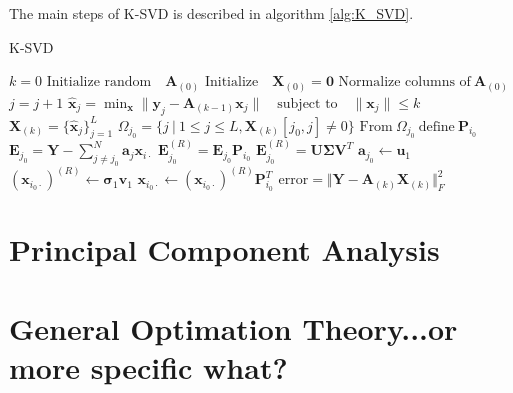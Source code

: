 The main steps of K-SVD is described in algorithm \ref{alg:K_SVD}. 
\begin{algorithm}[H]
\caption{K-SVD}
\begin{algorithmic}[1]
			\State$k = 0$			
			\State$\text{Initialize random} \quad  \textbf{A}_{(0)}$            
			\State$\text{Initialize} \quad \textbf{X}_{(0)}=\mathbf{0}$
			\State
            \State$\text{Normalize columns of} \ \textbf{A}_{(0)}$
                \State $j = j+1$
                 
                	\State$\hat{\textbf{x}}_{j} = \min_{\textbf{x}} \|\textbf{y}_j -\textbf{A}_{(k-1)}\textbf{x}_{j}\| \quad \text{subject to} \quad \|\textbf{x}_{j}\| \leq k $ 
				\EndFor
				\State$\textbf{X}_{(k)} = \lbrace \hat{\textbf{x}}_{j} \rbrace_{j=1}^{L}$
					\State$\Omega_{j_0} = \lbrace j \ \vert \ 1 \leq j \leq L, \textbf{X}_{(k)} [j_0, j]\neq 0\rbrace$
					\State$\text{From} \ \Omega_{j_0} \ \text{define} \ \textbf{P}_{i_0} $
					\State$\textbf{E}_{j_0} =  \textbf{Y} - \sum_{j \neq j_{0}}^{N} \textbf{a}_j \textbf{x}_{i \cdot}$
					\State$\textbf{E}_{j_0}^{(R)} =  \textbf{E}_{j_0} \textbf{P}_{i_0}$
					\State$\textbf{E}_{j_0}^{(R)} =\textbf{U} \boldsymbol{\Sigma} \textbf{V}^T$ 
					\State$\textbf{a}_{j_0} \gets \textbf{u}_{1}$ 
					\State$\left( \textbf{x}_{i_0 \cdot} \right)^{(R)} \gets \boldsymbol{\sigma}_{1} \textbf{v}_{1}$
					\State$\textbf{x}_{i_0 \cdot} \gets \left( \textbf{x}_{i_0 \cdot} \right)^{(R)} \textbf{P}_{i_0}^T $ 
				\EndFor
				\State$\text{error} = \Vert \textbf{Y} - \textbf{A}_{(k)} \textbf{X}_{(k)} \Vert_{F}^2 $
          		\EndWhile
            \EndProcedure
        \end{algorithmic} 
        \label{alg:K_SVD}
\end{algorithm}

\section{Principal Component Analysis}\label{app_sec:PCA}

\section{General Optimation Theory...or more specific what?}
